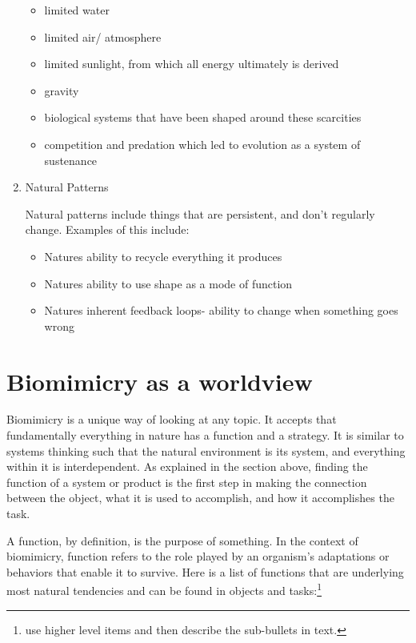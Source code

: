 \begin{enumerate}
\begin{itemize}
  \item limited water
  \item limited air/ atmosphere
  \item limited sunlight, from which all energy ultimately is derived
  \item gravity
  \item biological systems that have been shaped around these scarcities
  \item competition and predation which led to evolution as a system of sustenance
\end{itemize}

\item Natural Patterns

Natural patterns include things that are persistent, and don't regularly change. Examples of this include:
\begin{itemize}
  \item Natures ability to recycle everything it produces
  \item Natures ability to use shape as a mode of function
  \item Natures inherent feedback loops- ability to change when something goes wrong
\end {itemize}

\end{enumerate}

\section{Biomimicry as a worldview}

Biomimicry is a unique way of looking at any topic. It accepts that fundamentally everything in nature has a function and a strategy. It is similar to systems thinking such that the natural environment is its system, and everything within it is interdependent. As explained in the section above, finding the function of a system or product is the first step in making the connection between the object, what it is used to accomplish, and how it accomplishes the task. 
	
A function, by definition, is the purpose of something. In the context of biomimicry, function refers to the role played by an organism's adaptations or behaviors that enable it to survive. Here is a list of functions that are underlying most natural tendencies and can be found in objects and tasks:\footnote{use higher level items and then describe the sub-bullets in text.}

